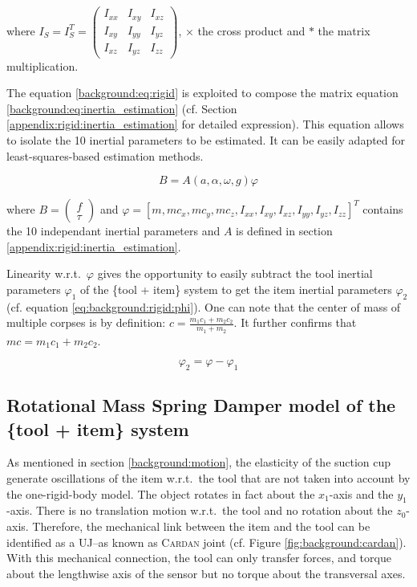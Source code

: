 \documentclass[/home/francois/latex/report/main.tex]{subfiles}
\begin{document}
where $I_S = I_S^T =
\begin{pmatrix}
 I_{xx} & I_{xy} & I_{xz} \\
 I_{xy} & I_{yy} & I_{yz} \\
 I_{xz} & I_{yz} & I_{zz}
\end{pmatrix}
$, $\times$ the cross product and $\ast$ the matrix multiplication.

The equation \ref{background:eq:rigid} is exploited to compose the matrix equation \ref{background:eq:inertia_estimation} (cf. Section \ref{appendix:rigid:inertia_estimation} for detailed expression). This equation allows to isolate the 10 inertial parameters to be estimated. It can be easily adapted for least-squares-based estimation methods.

\begin{equation}
  \label{background:eq:inertia_estimation}
B = A(a, \alpha, \omega, g) \varphi
\end{equation}

where $B =  \begin{pmatrix} f \\ \tau \end{pmatrix}$ and $\varphi = [m, m c_x, m c_y, m c_z, I_{xx}, I_{xy}, I_{xz}, I_{yy}, I_{yz}, I_{zz}]^T$ contains the 10 independant inertial parameters and $A$ is defined in section \ref{appendix:rigid:inertia_estimation}.

Linearity w.r.t.\ $\varphi$ gives the opportunity to easily subtract the tool inertial parameters $\varphi_1$ of the \{tool + item\} system to get the item inertial parameters $\varphi_2$ (cf. equation \ref{eq:background:rigid:phi}). One can note that the center of mass of multiple corpses is by definition: $c = \frac{m_1 c_1 + m_2 c_2}{m_1 + m_2}$. It further confirms that $mc = m_1 c_1 + m_2 c_2$.

\begin{equation}
  \label{eq:background:rigid:phi}
  \varphi_2 = \varphi - \varphi_{1}
\end{equation}


\subsection{Rotational Mass Spring Damper model of the \{tool + item\} system}
\label{section:background:rmsd}

As mentioned in section \ref{background:motion}, the elasticity of the suction cup generate oscillations of the item w.r.t.\ the tool that are not taken into account by the one-rigid-body model. The object rotates in fact about the $x_1$-axis and the $y_1$-axis. There is no translation motion w.r.t.\ the tool and no rotation about the $z_0$-axis. Therefore, the mechanical link between the item and the tool can be identified as a \ac{UJ}–as known as \textsc{Cardan} joint (cf. Figure \ref{fig:background:cardan}). With this mechanical connection, the tool can only transfer forces, and torque about the lengthwise axis of the sensor but no torque about the transversal axes.
\end{document}
